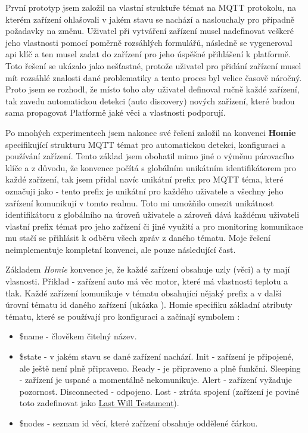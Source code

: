 První prototyp jsem založil na vlastní struktuře témat na MQTT protokolu, na kterém zařízení ohlašovali v jakém stavu se nachází a naslouchaly pro případně požadavky na změnu. Uživatel při vytváření zařízení musel nadefinovat veškeré jeho vlastnosti pomocí poměrně rozsáhlých formulářů, následně se vygeneroval api klíč a ten musel zadat do zařízení pro jeho úspěšné přihlášení k platformě. Toto řešení se ukázalo jako nešťastné, protože uživatel pro přidání zařízení musel mít rozsáhlé znalosti dané problematiky a tento proces byl velice časově náročný. Proto jsem se rozhodl, že místo toho aby uživatel definoval ručně každé zařízení, tak zavedu automatickou detekci (auto discovery) nových zařízení, které budou sama propagovat Platformě jaké věci a vlastnosti podporují.

Po mnohých experimentech jsem nakonec své řešení založil na konvenci \textbf{Homie} \cite{homie} specifikující strukturu MQTT témat pro automatickou detekci, konfiguraci a používání zařízení. Tento základ jsem obohatil mimo jiné o výměnu párovacího klíče a z důvodu, že konvence počítá s globálním unikátním identifikátorem pro každé zařízení, tak jsem přidal navíc unikátní prefix pro MQTT téma, které označuji jako  - tento prefix je unikátní pro každého uživatele a všechny jeho zařízení komunikují v tomto realmu. Toto mi umožňilo omezit unikátnost identifikátoru z globálního na úroveň uživatele a zároveň dává každému uživateli vlastní prefix témat pro jeho zařízení či jiné využití a pro monitoring komunikace mu stačí se přihlásit k odběru všech zpráv z daného tématu. Moje řešení neimplementuje kompletní konvenci, ale pouze následující čast.

Základem \textit{Homie} konvence je, že každé zařízení obsahuje uzly (věci) a ty mají vlasnosti. Přiklad - zařízení auto má věc motor, které má vlastnosti teplotu a tlak. Každé zařízení komunikuje v tématu obsahující nějaký prefix a v další úrovní tématu id daného zařízení (ukázka ). Homie specifiku základní atributy tématu, které se používají pro konfiguraci a začínají symbolem \uv{\$}:
\begin{itemize}
    \item \$name - člověkem čitelný název.
    \item \$state - v jakém stavu se dané zařízení nachází. Init - zařízení je připojené, ale ještě není plně připraveno. Ready - je připraveno a plně funkční. Sleeping - zařízení je uspané a momentálně nekomunikuje. Alert - zařízení vyžaduje pozornost. Disconnected - odpojeno. Lost - ztráta spojení (zařízení je poviné toto zadefinovat jako \hyperlink{LWT}{Last Will Testament}).
    \item \$nodes - seznam id věcí, které zařízení obsahuje oddělené čárkou.
\end{itemize}

